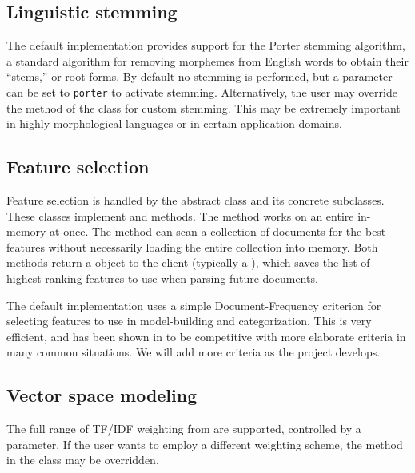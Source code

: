 \begin{singlespace}
\subsection*{Linguistic stemming}
The default implementation provides support for the Porter stemming
algorithm, a standard algorithm for removing morphemes from English
words to obtain their ``stems,'' or root forms.  By default no
stemming is performed, but a  parameter can be set to
\texttt{porter} to activate stemming.  Alternatively, the user may
override the  method of the 
class for custom stemming.  This may be extremely important in highly
morphological languages or in certain application domains.

\subsection*{Feature selection}
Feature selection is handled by the abstract 
class and its concrete subclasses.  These classes implement
 and  methods.  The
 method works on an entire
 in-memory at once.  The 
method can scan a collection of documents for the best features
without necessarily loading the entire collection into memory.  Both
methods return a  object to the client (typically
a ), which saves the list of highest-ranking
features to use when parsing future documents.

The default implementation uses a simple Document-Frequency criterion
for selecting features to use in model-building and categorization.
This is very efficient, and has been shown in \cite{yang:97} to be
competitive with more elaborate criteria in many common situations.
We will add more criteria as the project develops.

\subsection*{Vector space modeling}
The full range of TF/IDF weighting from \cite{salton:88} are
supported, controlled by a  parameter.  If
the user wants to employ a different weighting scheme, the
 method in the  class
may be overridden.


\end{singlespace}
